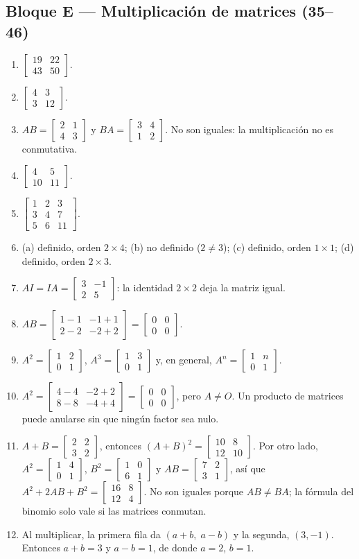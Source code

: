 \documentclass[12pt, letterpaper]{article}
\newcommand{\mwmat}[1]{\ensuremath{\begin{bmatrix}#1\end{bmatrix}}}
\begin{document}
\subsection*{Bloque E — Multiplicación de matrices (35--46)}
\begin{enumerate}[label=\textbf{\arabic*.}, start=35, leftmargin=*]
  \item $\mwmat{19&22\\43&50}$.
  \item $\mwmat{4&3\\3&12}$.
  \item $AB=\mwmat{2&1\\4&3}$ y $BA=\mwmat{3&4\\1&2}$. No son iguales:
        la multiplicación no es conmutativa.
  \item $\mwmat{4&5\\10&11}$.
  \item $\mwmat{1&2&3\\3&4&7\\5&6&11}$.
  \item (a) definido, orden $2\times4$; (b) no definido
        ($2\neq3$); (c) definido, orden $1\times1$; (d) definido, orden
        $2\times3$.
  \item $AI=IA=\mwmat{3&-1\\2&5}$: la identidad $2\times2$ deja la matriz
        igual.
  \item $AB=\mwmat{1-1&-1+1\\2-2&-2+2}=\mwmat{0&0\\0&0}$.
  \item $A^2=\mwmat{1&2\\0&1}$, $A^3=\mwmat{1&3\\0&1}$ y, en general,
        $A^n=\mwmat{1&n\\0&1}$.
  \item $A^2=\mwmat{4-4&-2+2\\8-8&-4+4}=\mwmat{0&0\\0&0}$, pero
        $A\neq O$. Un producto de matrices puede anularse sin que ningún
        factor sea nulo.
  \item $A+B=\mwmat{2&2\\3&2}$, entonces
        $(A+B)^2=\mwmat{10&8\\12&10}$. Por otro lado,
        $A^2=\mwmat{1&4\\0&1}$, $B^2=\mwmat{1&0\\6&1}$ y
        $AB=\mwmat{7&2\\3&1}$, así que
        $A^2+2AB+B^2=\mwmat{16&8\\12&4}$. No son iguales porque
        $AB\neq BA$; la fórmula del binomio solo vale si las matrices
        conmutan.
  \item Al multiplicar, la primera fila da $(a+b,\;a-b)$ y la segunda,
        $(3,-1)$. Entonces $a+b=3$ y $a-b=1$, de donde $a=2$, $b=1$.
\end{enumerate}
\end{document}
